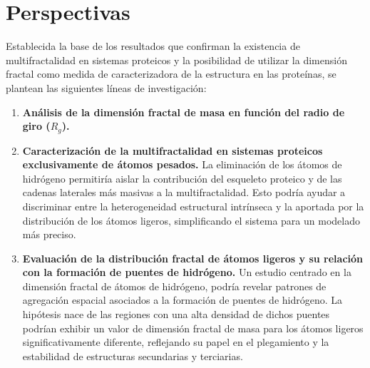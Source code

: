 \chapter*{Perspectivas}

Establecida la base de los resultados que confirman la existencia de multifractalidad en sistemas proteicos y la posibilidad de utilizar la dimensión fractal como medida de caracterizadora de  la estructura en las prote\'{i}nas, se plantean las siguientes líneas de investigación:

\begin{enumerate}
	\item \textbf{Análisis de la dimensión fractal de masa en función del radio de giro ($R_g$).} 
	\item \textbf{Caracterización de la multifractalidad en sistemas proteicos exclusivamente de átomos pesados.} La eliminación de los átomos de hidrógeno permitiría aislar la contribución del esqueleto proteico y de las cadenas laterales más masivas a la multifractalidad. Esto podría ayudar a discriminar entre la heterogeneidad estructural intrínseca y la aportada por la distribución de los átomos ligeros, simplificando el sistema para un modelado más preciso.

	\item \textbf{Evaluación de la distribución fractal de átomos ligeros y su relación con la formación de puentes de hidrógeno.} Un estudio centrado en la dimensión fractal de átomos de hidrógeno, podría revelar patrones de agregación espacial asociados a la formación de puentes de hidrógeno. La hipótesis nace de las regiones con una alta densidad de dichos puentes podrían exhibir un valor de dimensión fractal de masa para los átomos ligeros significativamente diferente, reflejando su papel en el plegamiento y la estabilidad de estructuras secundarias y terciarias.
\end{enumerate}







